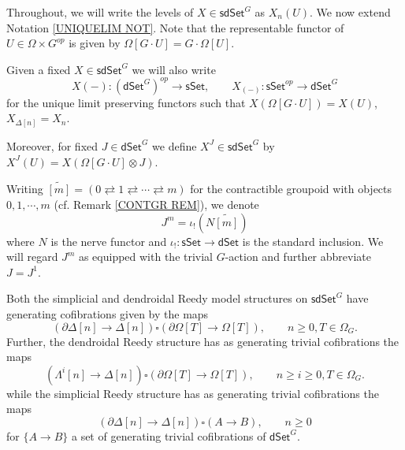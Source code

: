 \documentclass[a4paper,10pt
,draft
]{article}%
\begin{document}
Throughout, we will write the levels of 
$X \in \mathsf{sdSet}^G$ as 
$X_n(U)$. We now extend Notation \ref{UNIQUELIM NOT}.
Note that the representable functor of
$U \in \Omega \times G^{op}$ is given by $\Omega[G \cdot U] = G \cdot \Omega[U]$.

\begin{notation}\label{UNILIMDEN NOT}
	Given a fixed $X \in \mathsf{sdSet}^G$ we will also write
\[
	X(-)\colon \left(\mathsf{dSet}^G \right)^{op} \to \mathsf{sSet},\qquad 
	X_{(-)} \colon \mathsf{sSet}^{op} \to \mathsf{dSet}^{G}
\]
	for the unique limit preserving functors such that
	$X(\Omega[G \cdot U]) = X(U)$, $X_{\Delta[n]} = X_n$.
	
	Moreover, for fixed 
	$J \in \mathsf{dSet}^{G}$ we define
	$X^J \in \mathsf{sdSet}^G$ by
	$X^J(U) = X\left(\Omega[G \cdot U] \otimes J 
	\right)$.
\end{notation}



\begin{notation}\label{JM NOT}
Writing
	$\widetilde{[m]} = 
	(0 \rightleftarrows 
	1 \rightleftarrows \cdots
	\rightleftarrows m)$
for the contractible groupoid with objects 
$0,1,\cdots,m$ (cf. Remark \ref{CONTGR REM}),
we denote
\[
J^m = \iota_{!} \left(N \widetilde{[m]}\right)
\]
where $N$ is the nerve functor and
$\iota_! \colon \mathsf{sSet} \to \mathsf{dSet}$ is the standard inclusion.
We will regard $J^m$ as equipped with the trivial $G$-action and further abbreviate $J = J^1$.
\end{notation}


\begin{proposition}
	Both the simplicial and dendroidal Reedy model structures on 
	$\mathsf{sdSet}^G$ have generating cofibrations given by the maps
\begin{equation}\label{JOINTCOF EQ}
	\left(\partial \Delta [n] \to \Delta[n]\right)
		\square
	\left(\partial \Omega[T] \to \Omega[T]\right),
	\qquad
	n\geq 0, T \in \Omega_G.
\end{equation}
  Further, the dendroidal Reedy structure has as generating trivial cofibrations the maps
\begin{equation}\label{DENDTRIVCOF EQ}
	\left(\Lambda^i [n] \to \Delta[n]\right)
		\square
	\left(\partial \Omega[T] \to \Omega[T]\right),
	\qquad
	n\geq i \geq 0, T \in \Omega_G.
\end{equation}
while the simplicial Reedy structure has as generating trivial cofibrations the maps
\begin{equation}\label{SIMPTRIVCOF EQ}
	\left(\partial \Delta [n] \to \Delta[n]\right)
		\square
	\left(A \to B\right),
	\qquad
	n\geq 0
\end{equation}
for $\{A \to B\}$ a set of generating trivial cofibrations of
$\mathsf{dSet}^G$.
\end{proposition}
\end{document}
